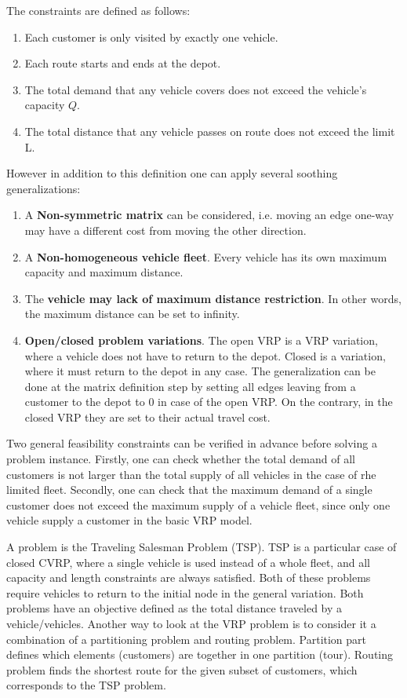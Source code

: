 \documentclass[11pt,a4paper,oneside]{book}
\begin{document}
The constraints are defined as follows:
\begin{enumerate}
\item Each customer is only visited by exactly one vehicle.
\item Each route starts and ends at the depot.
\item The total demand that any vehicle covers does not exceed the vehicle's capacity $Q$.
\item The total distance that any vehicle passes on route does not exceed the limit L. 
\end{enumerate}

However in addition to this definition one can apply several soothing generalizations:

\begin{enumerate}
\item A \textbf{Non-symmetric matrix} can be considered, i.e. moving an edge one-way may have a different cost from moving the other direction.
\item A \textbf{Non-homogeneous vehicle fleet}. Every vehicle has its own maximum capacity and maximum distance.
\item The \textbf{vehicle may lack of maximum distance restriction}. In other words, the maximum distance can be set to infinity.
\item \textbf{Open/closed problem variations}. The open VRP is a VRP variation, where a vehicle does not have to return to the depot. Closed is a variation, where it must return to the depot in any case. The generalization can be done at the matrix definition step by setting all edges leaving from a customer to the depot to 0 in case of the open VRP. On the contrary, in the closed VRP they are set to their actual travel cost.
\end{enumerate}

Two general feasibility constraints can be verified in advance before solving a problem instance. Firstly, one can check whether the total demand of all customers is not larger than the total supply of all vehicles in the case of rhe limited fleet. Secondly, one can check that the maximum demand of a single customer does not exceed the maximum supply of a vehicle fleet, since only one vehicle supply a customer in the basic VRP model.

A problem is the Traveling Salesman Problem (TSP). TSP is a particular case of closed CVRP, where a single vehicle is used instead of a whole fleet, and all capacity and length constraints are always satisfied. Both of these problems require vehicles to return to the initial node in the general variation. Both problems have an objective defined as the total distance traveled by a vehicle/vehicles. Another way to look at the VRP problem is to consider it a combination of a partitioning problem and routing problem. Partition part defines which elements (customers) are together in one partition (tour). Routing problem  finds the shortest route for the given subset of customers, which corresponds to the TSP problem.
\end{document}
